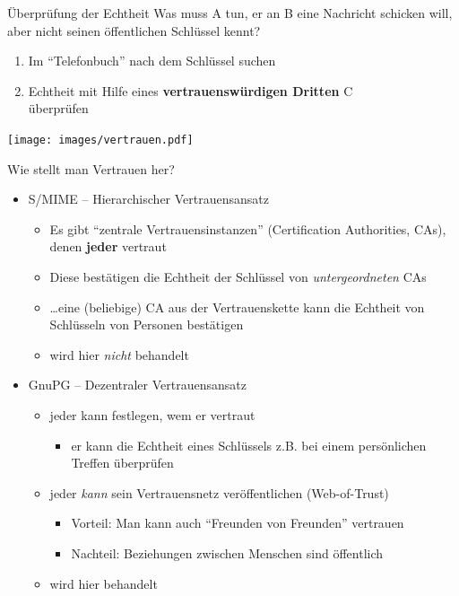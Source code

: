   \begin{frame}{Überprüfung der Echtheit}
  Was muss A tun, er an B eine Nachricht schicken will, aber nicht seinen öffentlichen Schlüssel kennt?\\
  \begin{enumerate}
    \item Im ``Telefonbuch'' nach dem Schlüssel suchen
    \item Echtheit mit Hilfe eines \textbf{vertrauenswürdigen Dritten} C\\überprüfen
  \end{enumerate}
  \begin{center}
    \texttt{[image: images/vertrauen.pdf]}
  \end{center}
  \end{frame}

  \begin{frame}{Wie stellt man Vertrauen her?}
    \begin{itemize}
      \item S/MIME -- Hierarchischer Vertrauensansatz
      \begin{itemize}
        \item Es gibt ``zentrale Vertrauensinstanzen'' (Certification Authorities, CAs), denen \textbf{jeder} vertraut
        \item Diese bestätigen die Echtheit der Schlüssel von  \textit{untergeordneten} CAs
        \item \ldots eine (beliebige) CA aus der Vertrauenskette kann die Echtheit von Schlüsseln von Personen bestätigen
        \item wird hier \textit{nicht} behandelt
      \end{itemize}
      \item GnuPG -- Dezentraler Vertrauensansatz
      \begin{itemize}
        \item jeder kann festlegen, wem er vertraut
        \begin{itemize}
          \item er kann die Echtheit eines Schlüssels z.B. bei einem persönlichen Treffen überprüfen
        \end{itemize}
        \item jeder \textit{kann} sein Vertrauensnetz veröffentlichen (Web-of-Trust)
        \begin{itemize}
          \item Vorteil: Man kann auch ``Freunden von Freunden'' vertrauen
          \item Nachteil: Beziehungen zwischen Menschen sind öffentlich 
        \end{itemize}
        \item wird hier behandelt
      \end{itemize}
    \end{itemize}
  \end{frame}


